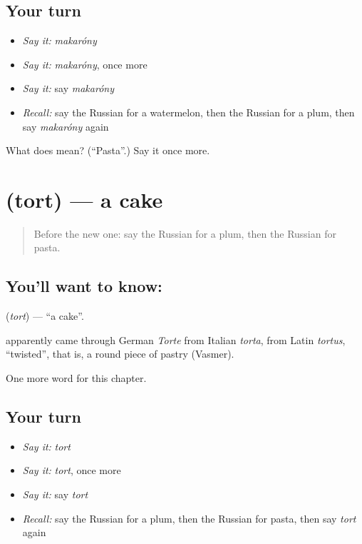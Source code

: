 \subsection*{Your turn}
\begin{itemize}
\raggedright
  \item \emph{Say it:} \emph{makaróny}
  \item \emph{Say it:} \emph{makaróny}, once more
  \item \emph{Say it:} say \emph{makaróny}
  \item \emph{Recall:} say the Russian for a watermelon, then the Russian for a plum, then say \emph{makaróny} again
\end{itemize}

\begin{tcolorbox}[breakable,colback=teal!4,colframe=teal!35!black,title={Before you move on}]
What does  mean? (\textquotedblleft{}Pasta\textquotedblright{}.) Say it once more.
\end{tcolorbox}
\section[\texorpdfstring{\ru{торт} (tort)}{торт (tort)}]{ (tort) — a cake}

\label{lesson:RU-C250-tort}



\begin{quote}
Before the new one: say the Russian for a plum, then the Russian for pasta.
\end{quote}

\subsection*{You'll want to know: }
\textbf{} (\emph{tort}) — \textquotedblleft{}a cake\textquotedblright{}.

\begin{cousinweb}
\textbf{} apparently came through German \emph{Torte} from Italian \emph{torta}, from Latin \emph{tortus}, \textquotedblleft{}twisted\textquotedblright{}, that is, a round piece of pastry (Vasmer).
\end{cousinweb}

\begin{grammarlens}[title={What you've built}]
One more word for this chapter.
\end{grammarlens}

\subsection*{Your turn}
\begin{itemize}
\raggedright
  \item \emph{Say it:} \emph{tort}
  \item \emph{Say it:} \emph{tort}, once more
  \item \emph{Say it:} say \emph{tort}
  \item \emph{Recall:} say the Russian for a plum, then the Russian for pasta, then say \emph{tort} again
\end{itemize}

